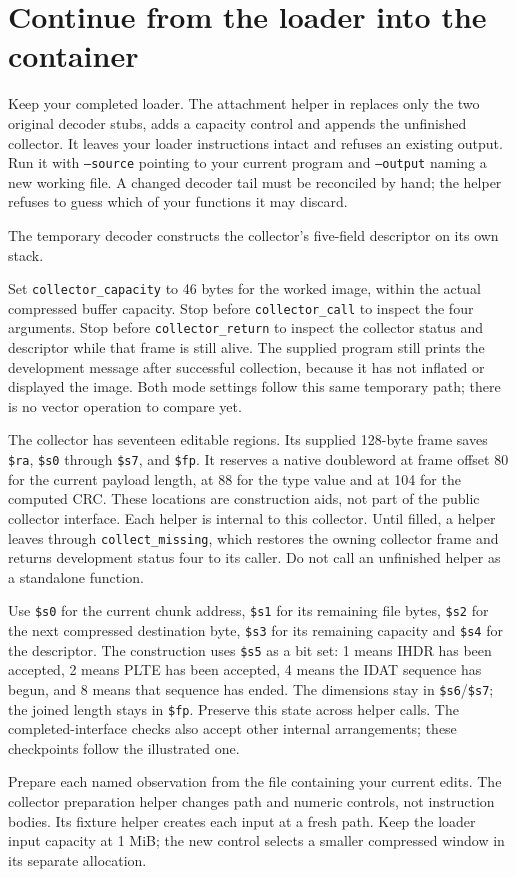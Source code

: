 \section{Continue from the loader into the container}
Keep your completed loader. The attachment helper in
 replaces only the two original
decoder stubs, adds a capacity control and appends the unfinished collector. It leaves
your loader instructions intact and refuses an existing output. Run it with
\texttt{--source} pointing to your current program and \texttt{--output} naming a new
working file. A changed decoder tail must be reconciled by hand; the helper refuses
to guess which of your functions it may discard.

The temporary decoder constructs the collector's five-field descriptor on its own
stack.

Set \texttt{collector\_capacity} to 46 bytes for the worked
image, within the actual compressed buffer capacity. Stop before
\texttt{collector\_call} to inspect the four arguments. Stop before
\texttt{collector\_return} to inspect the collector status and descriptor while that
frame is still alive. The supplied program still prints the development message after
successful collection, because it has not inflated or displayed the image. Both mode
settings follow this same temporary path; there is no vector operation to compare yet.

The collector has seventeen editable regions. Its supplied 128-byte frame saves
\texttt{\$ra}, \texttt{\$s0} through \texttt{\$s7}, and \texttt{\$fp}. It reserves a
native doubleword at frame offset 80 for the current payload length, at 88 for the type
value and at 104 for the computed CRC. These locations are construction aids, not part
of the public collector interface. Each helper is internal to this collector. Until
filled, a helper leaves through \texttt{collect\_missing}, which restores the owning
collector frame and returns development status four to its caller. Do not call an
unfinished helper as a standalone function.

Use \texttt{\$s0} for the current chunk address, \texttt{\$s1} for its remaining file
bytes, \texttt{\$s2} for the next compressed destination byte, \texttt{\$s3} for its
remaining capacity and \texttt{\$s4} for the descriptor. The construction uses
\texttt{\$s5} as a bit set: 1 means IHDR has been accepted, 2 means PLTE has been
accepted, 4 means the IDAT sequence has begun, and 8 means that sequence has ended.
The dimensions stay in \texttt{\$s6}/\texttt{\$s7}; the joined length stays in
\texttt{\$fp}. Preserve this state across helper calls. The completed-interface checks
also accept other internal arrangements; these checkpoints follow the illustrated one.

Prepare each named observation from the file containing your current edits. The
collector preparation helper changes path and numeric controls, not instruction bodies.
Its fixture helper creates each input at a fresh path. Keep the loader input capacity at 1 MiB; the new control selects a smaller compressed
window in its separate allocation.
